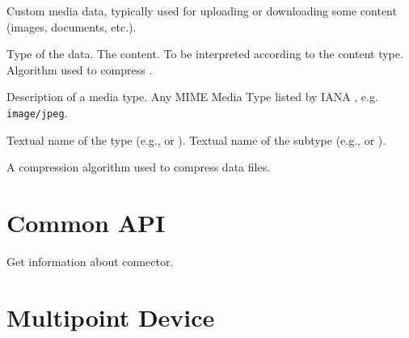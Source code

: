 \begin{Api}
Custom media data, typically used for uploading or downloading some content (images, documents, etc.).
\begin{ApiClassAttributes}
 Type of the data.
 The content. To be interpreted according to the content type.
 Algorithm used to compress .
\end{ApiClassAttributes}

Description of a media type. Any MIME Media Type listed by IANA \cite{IANA-MediaTypes}, e.g. \texttt{image/jpeg}.
\begin{ApiClassAttributes}
 Textual name of the type (e.g.,  or ).
 Textual name of the subtype (e.g.,  or ).
\end{ApiClassAttributes}

A compression algorithm used to compress data files.
\begin{ApiEnumValues}
\end{ApiEnumValues}


\end{Api}


\section{Common API}

\begin{Api}

Get information about connector.

\end{Api}

\section{Multipoint Device} \label{sect:connector-api-multipoint}

